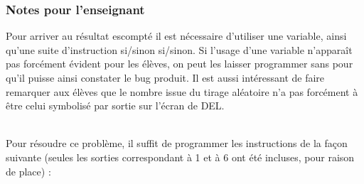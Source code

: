 \newpage
\subsubsection{Notes pour l'enseignant}

Pour arriver au résultat escompté il est nécessaire d'utiliser une variable, ainsi qu'une suite d'instruction si/sinon si/sinon. Si l'usage d'une variable n'apparaît pas forcément évident pour les élèves, on peut les laisser programmer sans pour qu'il puisse ainsi constater le bug produit.
Il est aussi intéressant de faire remarquer aux élèves que le nombre issue du tirage aléatoire n'a pas forcément à être celui symbolisé par sortie sur l'écran de DEL.


\begin{minipage}[t]{0.5\linewidth}
    \begin{methode}~\\
    Pour résoudre ce problème, il suffit de programmer les instructions de la façon suivante (seules les sorties correspondant à 1 et à 6 ont été incluses, pour raison de place) :
    

\end{methode}
\end{minipage}
